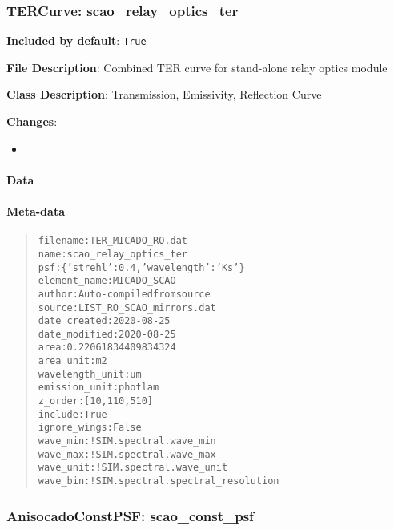 \subsubsection{TERCurve: \textquotedbl{}scao\_relay\_optics\_ter\textquotedbl{}%
  \label{tercurve-scao-relay-optics-ter}%
}

\textbf{Included by default}: \texttt{True}

\textbf{File Description}: Combined TER curve for stand-alone relay optics module

\textbf{Class Description}: Transmission, Emissivity, Reflection Curve

\textbf{Changes}:

\begin{itemize}
\item \end{itemize}


\paragraph{Data%
  \label{data}%
}


\paragraph{Meta-data%
  \label{meta-data}%
}

\begin{quote}
\begin{alltt}
       filename : TER_MICADO_RO.dat
           name : scao_relay_optics_ter
            psf : \{'strehl': 0.4, 'wavelength': 'Ks'\}
   element_name : MICADO_SCAO
         author : Auto-compiled from source
         source : LIST_RO_SCAO_mirrors.dat
   date_created : 2020-08-25
  date_modified : 2020-08-25
           area : 0.22061834409834324
      area_unit : m2
wavelength_unit : um
  emission_unit : photlam
        z_order : [10, 110, 510]
        include : True
   ignore_wings : False
       wave_min : !SIM.spectral.wave_min
       wave_max : !SIM.spectral.wave_max
      wave_unit : !SIM.spectral.wave_unit
       wave_bin : !SIM.spectral.spectral_resolution
\end{alltt}
\end{quote}


\subsubsection{AnisocadoConstPSF: \textquotedbl{}scao\_const\_psf\textquotedbl{}%
  \label{anisocadoconstpsf-scao-const-psf}%
}


